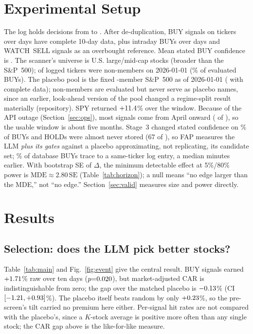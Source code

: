 \documentclass[conference]{IEEEtran}
\newcommand{\pct}[1]{$#1$\%}
\begin{document}
\section{Experimental Setup}
The log holds \nRaw{} decisions from \dFirst{} to \dLast{}. After de-duplication, \nBuy{} BUY signals on \nTick{} tickers over \nDays{} days have complete 10-day data, plus \iN{} intraday BUYs over \iDays{} days and \nWS{} WATCH~SELL signals as an overbought reference. Mean stated BUY confidence is \meanConf{}. The scanner's universe is \nScannerUniv{} U.S. large/mid-cap stocks (broader than the S\&P~500); \nNonIndex{} of \nLogTick{} logged tickers were non-members on 2026-01-01 (\nBuyNonIndexPct\% of evaluated BUYs). The placebo pool is the fixed \nIndexStart{}-member S\&P~500 as of 2026-01-01 (\nUniv{} with complete data); non-members are evaluated but never serve as placebo names, since an earlier, look-ahead version of the pool changed a regime-split result materially (repository). SPY returned \pct{\spyTotal} over the window. Because of the API outage (Section~\ref{sec:ops}), most signals come from April onward (\perFullN{} of \nBuy{}), so the usable window is about five months. Stage~3 changed stated confidence on \auStageChanged\% of BUYs and HOLDs were almost never stored (67 of \nRaw{}), so FAP measures the LLM \emph{plus its gates} against a placebo approximating, not replicating, its candidate set; \auTraced\% of database BUYs trace to a same-ticker log entry, a median \auOffset{} minutes earlier. With bootstrap SE of $\Delta$, the minimum detectable effect at 5\%/80\% power is $\mathrm{MDE}\approx2.80\,\mathrm{SE}$ (Table~\ref{tab:horizon}); a null means ``no edge larger than the MDE,'' not ``no edge.'' Section~\ref{sec:valid} measures size and power directly.

\section{Results}

\subsection{Selection: does the LLM pick better stocks?}
Table~\ref{tab:main} and Fig.~\ref{fig:event} give the central result. BUY signals earned \pct{\mBuyRawten} raw over ten days ($p{=}0.020$), but market-adjusted CAR is indistinguishable from zero; the gap over the matched placebo is \pct{\mBuyMinusMatch} (CI \pct{\mBuyMinusMatchCI}). The placebo itself beats random by only $+0.23$\%, so the pre-screen's tilt carried no premium here either. Per-signal hit rates are not compared with the placebo's, since a $K$-stock average is positive more often than any single stock; the CAR gap above is the like-for-like measure.
\end{document}
